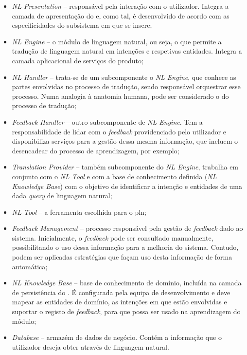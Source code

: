 \begin{itemize}
    \item 
    {
        \textit{NL Presentation} -- responsável pela interação com o utilizador. Integra a camada de apresentação do {\productname} e, como tal, é desenvolvido de acordo com as especificidades do subsistema em que se insere;
    }
    \item 
    {
        \textit{NL Engine} -- o módulo de linguagem natural, ou seja, o  que permite a tradução de linguagem natural em intenções e respetivas entidades. Integra a camada aplicacional de serviços do produto;
    }
    \item 
    {
        \textit{NL Handler} -- trata-se de um subcomponente o \textit{NL Engine}, que conhece as partes envolvidas no processo de tradução, sendo responsável orquestrar esse processo. Numa analogia à anatomia humana, pode ser considerado o  do processo de tradução;
    }
    \item
    {
        \textit{Feedback Handler} -- outro subcomponente de \textit{NL Engine}. Tem a responsabilidade de lidar com o \textit{feedback} providenciado pelo utilizador e disponibiliza serviços para a gestão dessa mesma informação, que incluem o desencadear do processo de aprendizagem, por exemplo;
    }
    \item 
    {
        \textit{Translation Provider} -- também subcomponente do \textit{NL Engine}, trabalha em conjunto com o \textit{NL Tool} e com a base de conhecimento definida (\textit{NL Knowledge Base}) com o objetivo de identificar a intenção e entidades de uma dada \textit{query} de linguagem natural;
    }
    \item 
    {
        \textit{NL Tool} -- a ferramenta escolhida para o \gls{pln};
    }
    \item 
    {
        \textit{Feedback Management} -- processo responsável pela gestão de \textit{feedback} dado ao sistema. Inicialmente, o \textit{feedback} pode ser consultado manualmente, possibilitando o uso dessa informação para a melhoria do sistema. Contudo, podem ser aplicadas estratégias que façam uso desta informação de forma automática;
    }
    \item 
    {
        \textit{NL Knowledge Base} -- base de conhecimento de domínio, incluída na camada de persistência do {\productname}. É configurada pela equipa de desenvolvimento e deve mapear as entidades de domínio, as intenções em que estão envolvidas e suportar o registo de \textit{feedback}, para que possa ser usado na aprendizagem do módulo;
    }
    \item 
    {
        \textit{Database} -- armazém de dados de negócio. Contém a informação que o utilizador deseja obter através de linguagem natural.
    }
\end{itemize}

